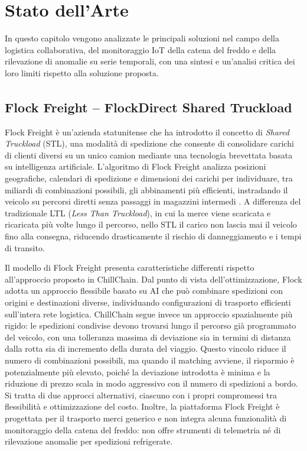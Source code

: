 \chapter{Stato dell'Arte}
\label{ch:stato-arte}

In questo capitolo vengono analizzate le principali soluzioni nel campo della logistica collaborativa, del monitoraggio IoT della catena del freddo e della rilevazione di anomalie su serie temporali, con una sintesi e un'analisi critica dei loro limiti rispetto alla soluzione proposta.

\section{Flock Freight -- FlockDirect\textsuperscript{\textregistered} Shared Truckload}

Flock Freight è un'azienda statunitense che ha introdotto il concetto di \textit{Shared Truckload} (STL), una modalità di spedizione che consente di consolidare carichi di clienti diversi su un unico camion mediante una tecnologia brevettata basata su intelligenza artificiale. L'algoritmo di Flock Freight analizza posizioni geografiche, calendari di spedizione e dimensioni dei carichi per individuare, tra miliardi di combinazioni possibili, gli abbinamenti più efficienti, instradando il veicolo su percorsi diretti senza passaggi in magazzini intermedi \cite{flockfreight2024}. A differenza del tradizionale LTL (\textit{Less Than Truckload}), in cui la merce viene scaricata e ricaricata più volte lungo il percorso, nello STL il carico non lascia mai il veicolo fino alla consegna, riducendo drasticamente il rischio di danneggiamento e i tempi di transito.

Il modello di Flock Freight presenta caratteristiche differenti rispetto all'approccio proposto in ChillChain. Dal punto di vista dell'ottimizzazione, Flock adotta un approccio flessibile basato su AI che può combinare spedizioni con origini e destinazioni diverse, individuando configurazioni di trasporto efficienti sull’intera rete logistica. ChillChain segue invece un approccio spazialmente più rigido: le spedizioni condivise devono trovarsi lungo il percorso già programmato del veicolo, con una tolleranza massima di deviazione sia in termini di distanza dalla rotta sia di incremento della durata del viaggio. Questo vincolo riduce il numero di combinazioni possibili, ma quando il matching avviene, il risparmio è potenzialmente più elevato, poiché la deviazione introdotta è minima e la riduzione di prezzo scala in modo aggressivo con il numero di spedizioni a bordo. Si tratta di due approcci alternativi, ciascuno con i propri compromessi tra flessibilità e ottimizzazione del costo. Inoltre, la piattaforma Flock Freight è progettata per il trasporto merci generico e non integra alcuna funzionalità di monitoraggio della catena del freddo: non offre strumenti di telemetria né di rilevazione anomalie per spedizioni refrigerate.

